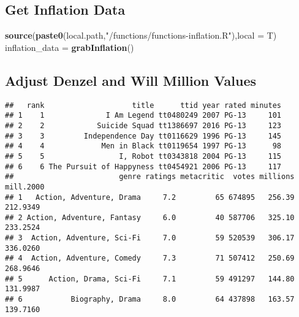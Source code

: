 \documentclass[
]{article}
\newenvironment{Shaded}{\begin{snugshade}}{\end{snugshade}}
\newcommand{\DataTypeTok}[1]{\textcolor[rgb]{0.13,0.29,0.53}{#1}}
\newcommand{\FloatTok}[1]{\textcolor[rgb]{0.00,0.00,0.81}{#1}}
\newcommand{\KeywordTok}[1]{\textcolor[rgb]{0.13,0.29,0.53}{\textbf{#1}}}
\newcommand{\NormalTok}[1]{#1}
\newcommand{\OperatorTok}[1]{\textcolor[rgb]{0.81,0.36,0.00}{\textbf{#1}}}
\newcommand{\StringTok}[1]{\textcolor[rgb]{0.31,0.60,0.02}{#1}}
\begin{document}
\hypertarget{get-inflation-data}{%
\subsection{Get Inflation Data}\label{get-inflation-data}}

\begin{Shaded}
\begin{Highlighting}[]
\KeywordTok{source}\NormalTok{(}\KeywordTok{paste0}\NormalTok{(local.path,}\StringTok{"/functions/functions-inflation.R"}\NormalTok{),}\DataTypeTok{local =}\NormalTok{ T)}
\NormalTok{inflation_data =}\StringTok{ }\KeywordTok{grabInflation}\NormalTok{()}
\end{Highlighting}
\end{Shaded}

\hypertarget{adjust-denzel-and-will-million-values}{%
\subsection{Adjust Denzel and Will Million
Values}\label{adjust-denzel-and-will-million-values}}

\begin{Shaded}
\end{Shaded}

\begin{verbatim}
##   rank                    title      ttid year rated minutes
## 1    1              I Am Legend tt0480249 2007 PG-13     101
## 2    2            Suicide Squad tt1386697 2016 PG-13     123
## 3    3         Independence Day tt0116629 1996 PG-13     145
## 4    4             Men in Black tt0119654 1997 PG-13      98
## 5    5                 I, Robot tt0343818 2004 PG-13     115
## 6    6 The Pursuit of Happyness tt0454921 2006 PG-13     117
##                        genre ratings metacritic  votes millions mill.2000
## 1   Action, Adventure, Drama     7.2         65 674895   256.39  212.9349
## 2 Action, Adventure, Fantasy     6.0         40 587706   325.10  233.2524
## 3  Action, Adventure, Sci-Fi     7.0         59 520539   306.17  336.0260
## 4  Action, Adventure, Comedy     7.3         71 507412   250.69  268.9646
## 5      Action, Drama, Sci-Fi     7.1         59 491297   144.80  131.9987
## 6           Biography, Drama     8.0         64 437898   163.57  139.7160
\end{verbatim}
\end{document}
